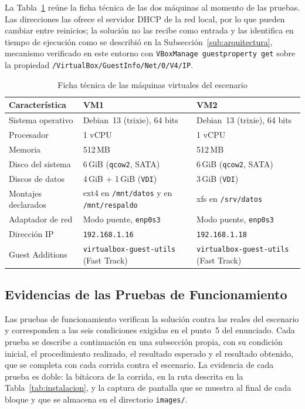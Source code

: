 La Tabla~\ref{tab:ficha} reúne la ficha técnica de las dos máquinas al momento de las pruebas. Las direcciones las ofrece el servidor DHCP de la red local, por lo que pueden cambiar entre reinicios; la solución no las recibe como entrada y las identifica en tiempo de ejecución como se describió en la Subsección~\ref{sub:arquitectura}, mecanismo verificado en este entorno con \texttt{VBoxManage guestproperty get} sobre la propiedad \texttt{/VirtualBox/GuestInfo/Net/0/V4/IP}.

\begin{table}[H]
    \centering
    \caption{Ficha técnica de las máquinas virtuales del escenario}
    \label{tab:ficha}
    \begin{tabular}{@{}lp{5.4cm}p{5.4cm}@{}}
        \toprule
        \textbf{Característica} & \textbf{VM1} & \textbf{VM2} \\
        \midrule
        Sistema operativo & Debian~13 (trixie), 64 bits & Debian~13 (trixie), 64 bits \\
        Procesador & 1 vCPU & 1 vCPU \\
        Memoria & 512\,MB & 512\,MB \\
        Disco del sistema & 6\,GiB (\texttt{qcow2}, SATA) & 6\,GiB (\texttt{qcow2}, SATA) \\
        Discos de datos & 4\,GiB + 1\,GiB (\texttt{VDI}) & 3\,GiB (\texttt{VDI}) \\
        Montajes declarados & ext4 en \texttt{/mnt/datos} y en \texttt{/mnt/respaldo} & xfs en \texttt{/srv/datos} \\
        Adaptador de red & Modo puente, \texttt{enp0s3} & Modo puente, \texttt{enp0s3} \\
        Dirección IP & \texttt{192.168.1.16} & \texttt{192.168.1.18} \\
        Guest Additions & \texttt{virtualbox-guest-utils} (Fast Track) & \texttt{virtualbox-guest-utils} (Fast Track) \\
        \bottomrule
    \end{tabular}
\end{table}

\subsection{Evidencias de las Pruebas de Funcionamiento}
\label{sub:evidencias}

Las pruebas de funcionamiento verifican la solución contra las \vm{} reales del escenario y corresponden a las seis condiciones exigidas en el punto~5 del enunciado. Cada prueba se describe a continuación en una subsección propia, con su condición inicial, el procedimiento realizado, el resultado esperado y el resultado obtenido, que se completa con cada corrida contra el escenario. La evidencia de cada prueba es doble: la bitácora de la corrida, en la ruta descrita en la Tabla~\ref{tab:instalacion}, y la captura de pantalla que se muestra al final de cada bloque y que se almacena en el directorio \texttt{images/}.

